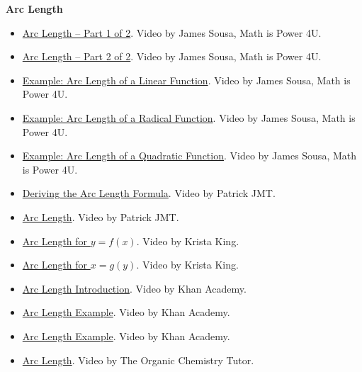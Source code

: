 \medskip

\textbf{Arc Length}

\begin{itemize}

\item \href{https://youtu.be/seoFxrNL85c}{Arc Length – Part 1 of 2}.  
Video by James Sousa, Math is Power 4U.

\item \href{https://youtu.be/NbnTw0opE_0}{Arc Length – Part 2 of 2}.  
Video by James Sousa, Math is Power 4U.

\item \href{https://www.youtube.com/watch?v=QttlclJGxJQ}{Example: Arc Length of a Linear Function}.  
Video by James Sousa, Math is Power 4U.

\item \href{https://www.youtube.com/watch?v=cw76RZ_fsZI}{Example: Arc Length of a Radical Function}.  
Video by James Sousa, Math is Power 4U.

\item \href{https://www.youtube.com/watch?v=0j227VZN0X8}{Example: Arc Length of a Quadratic Function}.  
Video by James Sousa, Math is Power 4U.

\item \href{https://youtu.be/yfJB4n-IzBE}{Deriving the Arc Length Formula}.  
Video by Patrick JMT.

\item \href{https://youtu.be/PwmCZAWeRNE}{Arc Length}.  
Video by Patrick JMT.

\item \href{https://youtu.be/tfn4cpkPHUI}{Arc Length for $y=f(x)$}.  
Video by Krista King.

\item \href{https://youtu.be/Mz3ELMAhMxk}{Arc Length for $x=g(y)$}.  
Video by Krista King.

\item \href{https://www.youtube.com/watch?v=8Y-snjheI9M}{Arc Length Introduction}.  
Video by Khan Academy.

\item \href{https://www.youtube.com/watch?v=OhISsmqv4_8}{Arc Length Example}.  
Video by Khan Academy.

\item \href{https://www.youtube.com/watch?v=MtRXjXdXDow}{Arc Length Example}.  
Video by Khan Academy.

\item \href{https://youtu.be/DNDAwWIL5FY}{Arc Length}.  
Video by The Organic Chemistry Tutor.

\end{itemize}

